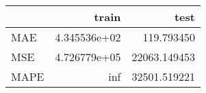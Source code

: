 \begin{tabular}{lrr}
\toprule
{} &         train &          test \\
\midrule
MAE  &  4.345536e+02 &    119.793450 \\
MSE  &  4.726779e+05 &  22063.149453 \\
MAPE &           inf &  32501.519221 \\
\bottomrule
\end{tabular}
